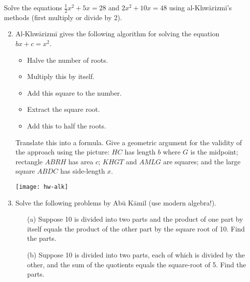 \begin{exercises}{}{}
	\exstart %
	Solve the equations $\frac 12x^2+5x=28$ and $2x^2+10x=48$ using al-Khwārizmī's methods (first multiply or divide by 2).
	  
	\begin{enumerate}\setcounter{enumi}{1}
	  \item%
	  \label{exs:alkalgebra}
	  Al-Khwārizmī gives the following algorithm for solving the equation $bx+c=x^2$.\\
	  \begin{minipage}[t]{0.6\linewidth}\vspace{0pt}
	  \begin{itemize}\itemsep0pt
	    \item Halve the number of roots.
	    \item Multiply this by itself.
	    \item Add this square to the number.
	    \item Extract the square root.
	    \item Add this to half the roots.
	  \end{itemize}
	  Translate this into a formula. Give a geometric argument for the validity of the approach using the picture: $HC$ has length $b$ where $G$ is the midpoint; rectangle $ABRH$ has area $c$; $KHGT$ and $AMLG$ are squares; and the large square $ABDC$ has side-length $x$.
	  \end{minipage}
	  \hfill
	  \begin{minipage}[t]{0.39\linewidth}\vspace{0pt}
	  	\flushright
	  	\texttt{[image: hw-alk]}
	  \end{minipage}
	  
	  
	  \item%
	  Solve the following problems by Abū Kāmil (use modern algebra!).
	  \begin{itemize}
	    \item[(a)] Suppose 10 is divided into two parts and the product of one part by itself equals the product of the other part by the square root of 10. Find the parts.
	    \item[(b)] Suppose 10 is divided into two parts, each of which is divided by the other, and the sum of the quotients equals the square-root of 5. Find the parts.
	  \end{itemize}
	\end{enumerate}
\end{exercises}

